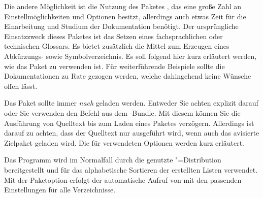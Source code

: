 \documentclass[%
  english,ngerman,%
  cdgeometry=no,DIV=12,automark,%
]{tudscrartcl}
\begin{document}
Die andere Möglichkeit ist die Nutzung des Paketes , das 
eine große Zahl an Einstellmöglichkeiten und Optionen besitzt, allerdings auch 
etwas Zeit für die Einarbeitung und Studium der Dokumentation benötigt. Der 
ursprüngliche Einsatzzweck dieses Paketes ist das Setzen eines fachsprachlichen 
oder technischen Glossars. Es bietet zusätzlich die Mittel zum Erzeugen eines 
Abkürzungs- sowie Symbolverzeichnis. Es soll folgend hier kurz erläutert 
werden, wie das Paket zu verwenden ist. Für weiterführende Beispiele sollte 
die Dokumentationen zu Rate gezogen werden, welche dahingehend keine Wünsche 
offen lässt. 

Das Paket  sollte immer \emph{nach}  
geladen werden. Entweder Sie achten explizit darauf oder Sie verwenden den 
Befehl  aus dem \KOMAScript-Bundle. Mit diesem können Sie 
die Ausführung von Quelltext bis zum Laden eines Paketes verzögern. Allerdings 
ist darauf zu achten, dass der Quelltext nur ausgeführt wird, wenn auch das 
avisierte Zielpaket geladen wird. Die für  verwendeten 
Optionen werden kurz erläutert.
%
\begin{Preamble+}
\AfterPackage*{hyperref}{%
\end{Preamble+}
\begin{Preamble}
\usepackage[%
\end{Preamble}
%
Das Programm  wird im Normalfall durch die genutzte 
"=Distribution bereitgestellt und für das alphabetische Sortieren 
der erstellten Listen verwendet. Mit der Paketoption  erfolgt 
der automatische Aufruf von  mit den passenden 
Einstellungen für alle Verzeichnisse. 
\end{document}
